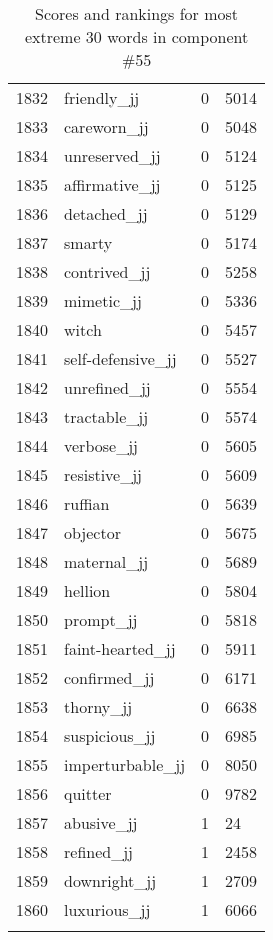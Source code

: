 \begin{longtable}[!htbp]{| rlr@{.}l |}
    1832 & friendly\_jj & 0 & 5014 \\
    1833 & careworn\_jj & 0 & 5048 \\
    1834 & unreserved\_jj & 0 & 5124 \\
    1835 & affirmative\_jj & 0 & 5125 \\
    1836 & detached\_jj & 0 & 5129 \\
    1837 & smarty & 0 & 5174 \\
    1838 & contrived\_jj & 0 & 5258 \\
    1839 & mimetic\_jj & 0 & 5336 \\
    1840 & witch & 0 & 5457 \\
    1841 & self-defensive\_jj & 0 & 5527 \\
    1842 & unrefined\_jj & 0 & 5554 \\
    1843 & tractable\_jj & 0 & 5574 \\
    1844 & verbose\_jj & 0 & 5605 \\
    1845 & resistive\_jj & 0 & 5609 \\
    1846 & ruffian & 0 & 5639 \\
    1847 & objector & 0 & 5675 \\
    1848 & maternal\_jj & 0 & 5689 \\
    1849 & hellion & 0 & 5804 \\
    1850 & prompt\_jj & 0 & 5818 \\
    1851 & faint-hearted\_jj & 0 & 5911 \\
    1852 & confirmed\_jj & 0 & 6171 \\
    1853 & thorny\_jj & 0 & 6638 \\
    1854 & suspicious\_jj & 0 & 6985 \\
    1855 & imperturbable\_jj & 0 & 8050 \\
    1856 & quitter & 0 & 9782 \\
    1857 & abusive\_jj & 1 & 24 \\
    1858 & refined\_jj & 1 & 2458 \\
    1859 & downright\_jj & 1 & 2709 \\
    1860 & luxurious\_jj & 1 & 6066 \\
    \hline
    \caption{Scores and rankings for most extreme 30 words in component \#55} \\
\end{longtable}
